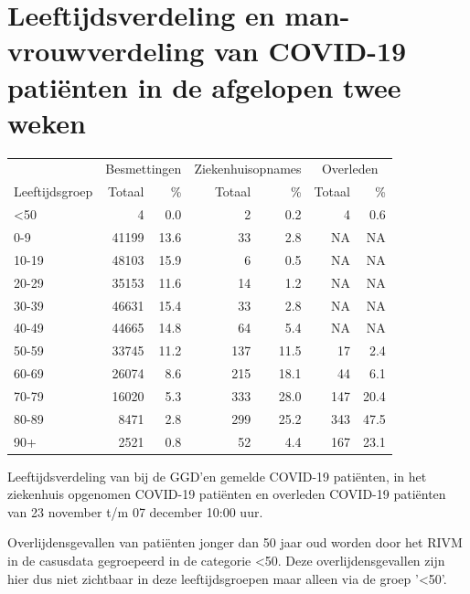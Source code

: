 \documentclass[
  english,
  man,floatsintext]{apa6}
\begin{document}
\hypertarget{leeftijdsverdeling-en-man-vrouwverdeling-van-covid-19-patiuxebnten-in-de-afgelopen-twee-weken}{%
\section{Leeftijdsverdeling en man-vrouwverdeling van COVID-19 patiënten in de afgelopen twee weken}\label{leeftijdsverdeling-en-man-vrouwverdeling-van-covid-19-patiuxebnten-in-de-afgelopen-twee-weken}}

\begin{table}
\centering\begingroup\fontsize{11}{13}\selectfont

\begin{threeparttable}
\begin{tabular}{lrrrrrr}
\toprule
\multicolumn{1}{c}{ } & \multicolumn{2}{c}{Besmettingen} & \multicolumn{2}{c}{Ziekenhuisopnames} & \multicolumn{2}{c}{Overleden} \\
\cmidrule(l{3pt}r{3pt}){2-3} \cmidrule(l{3pt}r{3pt}){4-5} \cmidrule(l{3pt}r{3pt}){6-7}
Leeftijdsgroep & Totaal & \% & Totaal & \% & Totaal & \%\\
\midrule
<50 & 4 & 0.0 & 2 & 0.2 & 4 & 0.6\\
0-9 & 41199 & 13.6 & 33 & 2.8 & NA & NA\\
10-19 & 48103 & 15.9 & 6 & 0.5 & NA & NA\\
20-29 & 35153 & 11.6 & 14 & 1.2 & NA & NA\\
30-39 & 46631 & 15.4 & 33 & 2.8 & NA & NA\\
40-49 & 44665 & 14.8 & 64 & 5.4 & NA & NA\\
50-59 & 33745 & 11.2 & 137 & 11.5 & 17 & 2.4\\
60-69 & 26074 & 8.6 & 215 & 18.1 & 44 & 6.1\\
70-79 & 16020 & 5.3 & 333 & 28.0 & 147 & 20.4\\
80-89 & 8471 & 2.8 & 299 & 25.2 & 343 & 47.5\\
90+ & 2521 & 0.8 & 52 & 4.4 & 167 & 23.1\\
\bottomrule
\end{tabular}
\begin{tablenotes}
\item[1] Leeftijdsverdeling van bij de GGD’en gemelde COVID-19 patiënten, in het ziekenhuis opgenomen COVID-19 patiënten en overleden COVID-19 patiënten van 23 november t/m 07 december 10:00 uur.
\item[2] Overlijdensgevallen van patiënten jonger dan 50 jaar oud worden door het RIVM in de casusdata gegroepeerd in de categorie <50. Deze overlijdensgevallen zijn hier dus niet zichtbaar in deze leeftijdsgroepen maar alleen via de groep '<50'.
\end{tablenotes}
\end{threeparttable}
\endgroup{}
\end{table}
\end{document}
